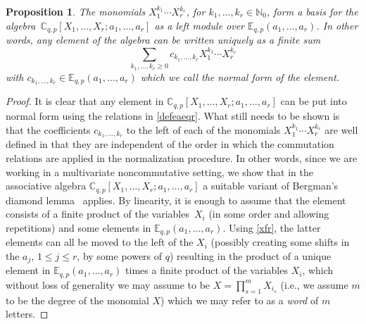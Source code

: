 \documentclass[pdftex]{sigma}
\numberwithin{equation}{section}
\newtheorem{Proposition}[Theorem]{Proposition}
\theoremstyle{definition}
\newcommand{\C}{\mathbb C}
\newcommand{\E}{\mathbb E}
\newcommand{\N}{\mathbb N}
\begin{document}
\begin{Proposition}\label{prop}
The monomials $X_1^{k_1}\cdots X_r^{k_r}$,
for $k_1,\dots,k_r\in\N_0$, form a \textit{basis} for the
algebra~${\C_{q,p}[X_1,\dots,X_r;a_1,\dots,a_r]}$
as a left module over $\E_{q,p}(a_1,\dots,a_r)$.
In other words, any element of the algebra can be written uniquely
as a finite sum
\[
\sum_{k_1,\dots,k_r\ge 0} c_{k_1,\dots,k_r}X_1^{k_1}\cdots X_r^{k_r}
\]
with $c_{k_1,\dots,k_r}\in \E_{q,p}(a_1,\dots,a_r)$ which
we call the \textit{normal form} of the element.
\end{Proposition}
\begin{proof}
It is clear that any element in
$\C_{q,p}[X_1,\dots,X_r;a_1,\dots,a_r]$
can be put into normal form using the relations in \eqref{defeaeqr}.
What still needs to be shown is that the coefficients $c_{k_1,\dots,k_r}$ to the left of each of the
monomials $X_1^{k_1}\cdots X_r^{k_r}$ are well defined in that
they are independent of the order in which the commutation relations
are applied in the normalization procedure.
In other words, since we are working in a multivariate
noncommutative setting, we show that in the associative algebra
$\C_{q,p}[X_1,\dots,X_r;a_1,\dots,a_r]$ a suitable
variant of Bergman's diamond lemma~\cite{B} applies.
By linearity, it is enough to assume that the element consists
of a finite product of the variables~$X_i$ (in some order and
allowing repetitions) and some elements in
$\E_{q,p}(a_1,\dots,a_r)$. Using \eqref{xfr},
the latter elements can all be moved
to the left of the $X_i$ (possibly creating some shifts in the
$a_j$, $1\le j\le r$, by some powers of $q$) resulting in the
product of a unique element in $\E_{q,p}(a_1,\dots,a_r)$ times
a finite product of the variables $X_i$, which without loss
of generality we may assume to be $X=\prod_{s=1}^m X_{i_s}$
(i.e., we assume $m$ to be the degree of the monomial $X$)
which we may refer to as a \textit{word} of $m$ letters.


\end{proof}
\end{document}
